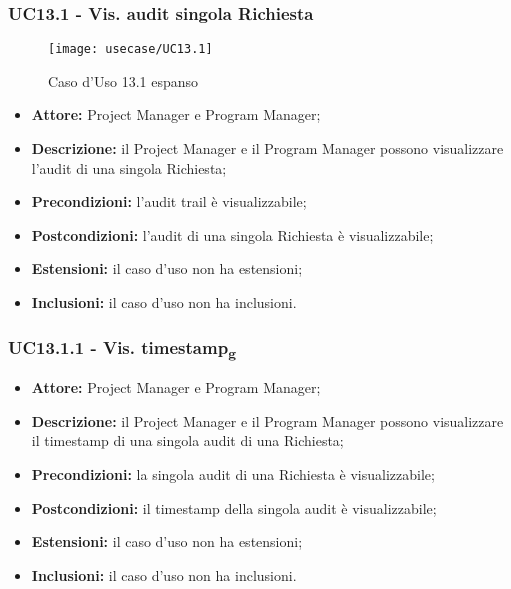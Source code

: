 \subsubsection*{UC13.1 - Vis. audit singola Richiesta}

\begin{figure}[H] 
    \centering 
    \texttt{[image: usecase/UC13.1]} 
    \caption{Caso d'Uso 13.1 espanso}
\end{figure}

\begin{itemize}[label=$\circ$]
\item \textbf{Attore:} Project Manager e Program Manager;
\item \textbf{Descrizione:} il Project Manager e il Program Manager possono visualizzare l'audit di una singola Richiesta;
\item \textbf{Precondizioni:} l'audit trail è visualizzabile;
\item \textbf{Postcondizioni:} l'audit di una singola Richiesta è visualizzabile;
\item \textbf{Estensioni:} il caso d'uso non ha estensioni;
\item \textbf{Inclusioni:} il caso d'uso non ha inclusioni.
\end{itemize}

\subsubsection*{UC13.1.1 - Vis. timestamp\textsubscript{g}}
\begin{itemize}[label=$\circ$]
\item \textbf{Attore:} Project Manager e Program Manager;
\item \textbf{Descrizione:} il Project Manager e il Program Manager possono visualizzare il timestamp di una singola audit di una Richiesta;
\item \textbf{Precondizioni:} la singola audit di una Richiesta è visualizzabile;
\item \textbf{Postcondizioni:} il timestamp della singola audit è visualizzabile;
\item \textbf{Estensioni:} il caso d'uso non ha estensioni;
\item \textbf{Inclusioni:} il caso d'uso non ha inclusioni.
\end{itemize}


